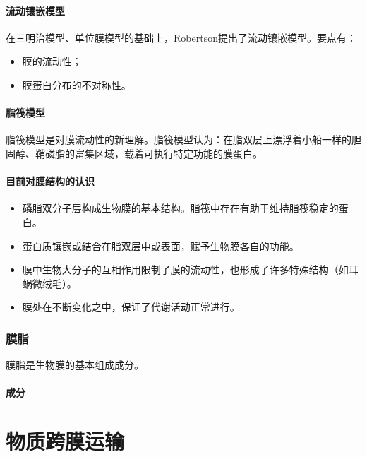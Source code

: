 \paragraph{流动镶嵌模型}

在三明治模型、单位膜模型的基础上，Robertson提出了流动镶嵌模型。要点有：
\begin{itemize}
	\item 膜的流动性；
	\item 膜蛋白分布的不对称性。
\end{itemize}

\paragraph{脂筏模型}

脂筏模型是对膜流动性的新理解。脂筏模型认为：在脂双层上漂浮着小船一样的胆固醇、鞘磷脂的富集区域，载着可执行特定功能的膜蛋白。

\paragraph{目前对膜结构的认识}

\begin{itemize}
	\item 磷脂双分子层构成生物膜的基本结构。脂筏中存在有助于维持脂筏稳定的蛋白。
	\item 蛋白质镶嵌或结合在脂双层中或表面，赋予生物膜各自的功能。
	\item 膜中生物大分子的互相作用限制了膜的流动性，也形成了许多特殊结构（如耳蜗微绒毛）。
	\item 膜处在不断变化之中，保证了代谢活动正常进行。
\end{itemize}

\subsubsection{膜脂}

膜脂是生物膜的基本组成成分。

\paragraph{成分}





\section{物质跨膜运输}

